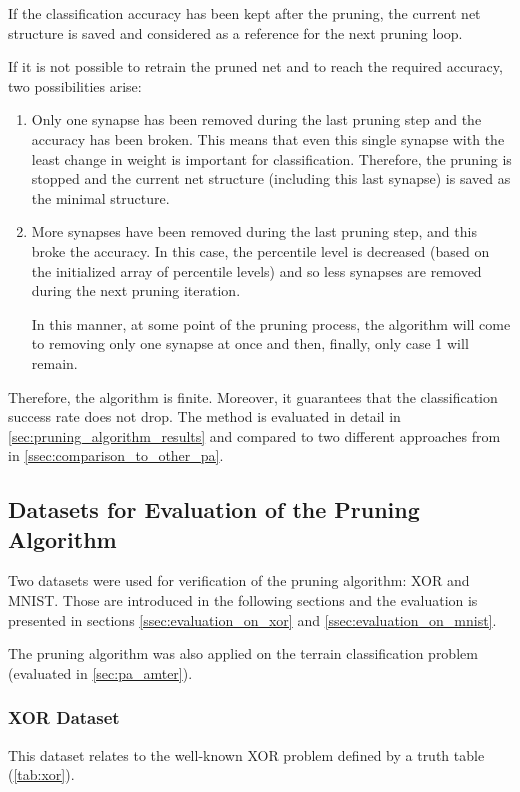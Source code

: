If the classification accuracy has been kept after the pruning, the current net structure is saved and considered as a reference for the next pruning loop.

If it is not possible to retrain the pruned net and to reach the required accuracy, two possibilities arise:

\begin{enumerate}
\item Only one synapse has been removed during the last pruning step and the accuracy has been broken. This means that even this single synapse with the least change in weight is important for classification. Therefore, the pruning is stopped and the current net structure (including this last synapse) is saved as the minimal structure.
\item More synapses have been removed during the last pruning step, and this broke the accuracy. In this case, the percentile level is decreased (based on the initialized array of percentile levels) and so less synapses are removed during the next pruning iteration.

In this manner, at some point of the pruning process, the algorithm will come to removing only one synapse at once and then, finally, only case 1 will remain.
\end{enumerate}

Therefore, the algorithm is finite. Moreover, it guarantees that the classification success rate does not drop. The method is evaluated in detail in \cref{sec:pruning_algorithm_results} and compared to two different approaches from \citep{article:10:pa} in \cref{ssec:comparison_to_other_pa}.

\subsection{Datasets for Evaluation of the Pruning Algorithm} \label{ssec:testing_datasets}
Two datasets were used for verification of the pruning algorithm: XOR and MNIST. Those are introduced in the following sections and the evaluation is presented in sections \ref{ssec:evaluation_on_xor} and \ref{ssec:evaluation_on_mnist}.

The pruning algorithm was also applied on the terrain classification problem (evaluated in \cref{sec:pa_amter}).

\subsubsection*{XOR Dataset}
This dataset relates to the well-known XOR problem defined by a truth table (\cref{tab:xor}).

